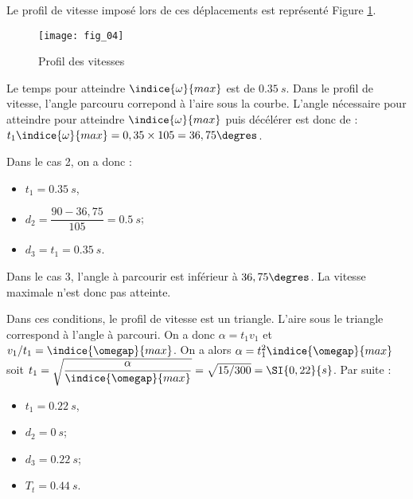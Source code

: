 Le profil de vitesse imposé lors de ces déplacements est représenté Figure \ref{kuka:fig:04}.

\begin{figure}[!h]
\centering
\texttt{[image: fig\_04]}
\caption{Profil des vitesses  \label{kuka:fig:04}}
\end{figure}
\fi

\ifprof
\begin{corrige}
Le temps pour atteindre $\indice{\omega}{max}$ est de $\SI{0,35}{s}$.
Dans le profil de vitesse, l'angle parcouru correpond à l'aire sous la courbe. 
L'angle nécessaire pour atteindre pour atteindre $\indice{\omega}{max}$ puis décélérer est donc de :
$t_1 \indice{\omega}{max} = 0,35 \times 105 = 36,75 \degres$.

Dans le cas 2, on a donc :
\begin{itemize}
\item $t_1 = \SI{0,35}{s}$, 
\item $d_2 =  \dfrac{90-36,75}{105} =  \SI{0,5}{s}$;
\item $d_3 = t_1 =  \SI{0,35}{s}$.
\end{itemize}

Dans le cas 3, l'angle à parcourir est inférieur à $36,75 \degres$.
La vitesse maximale n'est donc pas atteinte. 

Dans ces conditions, le profil de vitesse est un triangle. L'aire sous le triangle correspond à l'angle à parcouri. 
On a donc $\alpha = t_1 v_1$ et $v_1/t_1 = \indice{\omegap}{max}$.
On a alors $\alpha = t_1^2 \indice{\omegap}{max}$ soit $t_1 =\sqrt{\dfrac{\alpha}{\indice{\omegap}{max}}} = \sqrt{15/300} = \SI{0,22}{s}$. Par suite : 
\begin{itemize}
\item $t_1 = \SI{0,22}{s}$, 
\item $d_2 =  \SI{0}{s}$;
\item $d_3 =  \SI{0,22}{s}$;
\item $T_t = \SI{0,44}{s}$.
\end{itemize}

\end{corrige}
\else
\fi

\ifprof
\else

